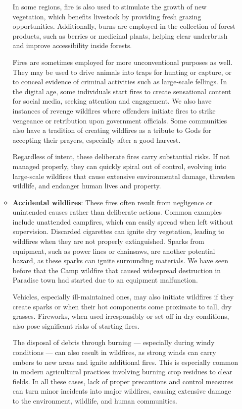 \documentclass[
  12 pt,
]{Nemilov}
\begin{document}
\begin{enumerate}
\begin{itemize}
    In some regions, fire is also used to stimulate the growth of new vegetation, which benefits livestock by providing fresh grazing opportunities. Additionally, burns are employed in the collection of forest products, such as berries or medicinal plants, helping clear underbrush and improve accessibility inside forests.

    Fires are sometimes employed for more unconventional purposes as well. They may be used to drive animals into traps for hunting or capture, or to conceal evidence of criminal activities such as large-scale fellings. In the digital age, some individuals start fires to create sensational content for social media, seeking attention and engagement. We also have instances of revenge wildfires where offenders initiate fires to strike vengeance or retribution upon government officials. Some communities also have a tradition of creating wildfires as a tribute to Gods for accepting their prayers, especially after a good harvest.

    Regardless of intent, these deliberate fires carry substantial risks. If not managed properly, they can quickly spiral out of control, evolving into large-scale wildfires that cause extensive environmental damage, threaten wildlife, and endanger human lives and property.
  \item
    \textbf{Accidental wildfires}: These fires often result from negligence or unintended causes rather than deliberate actions. Common examples include unattended campfires, which can easily spread when left without supervision. Discarded cigarettes can ignite dry vegetation, leading to wildfires when they are not properly extinguished. Sparks from equipment, such as power lines or chainsaws, are another potential hazard, as these sparks can ignite surrounding materials. We have seen before that the Camp wildfire that caused widespread destruction in Paradise town had started due to an equipment malfunction.

    Vehicles, especially ill-maintained ones, may also initiate wildfires if they create sparks or when their hot components come proximate to tall, dry grasses. Fireworks, when used irresponsibly or set off in dry conditions, also pose significant risks of starting fires.

    The disposal of debris through burning --- especially during windy conditions --- can also result in wildfires, as strong winds can carry embers to new areas and ignite additional fires. This is especially common in modern agricultural practices involving burning crop residues to clear fields. In all these cases, lack of proper precautions and control measures can turn minor incidents into major wildfires, causing extensive damage to the environment, wildlife, and human communities.
  \end{itemize}
\end{enumerate}
\end{document}
